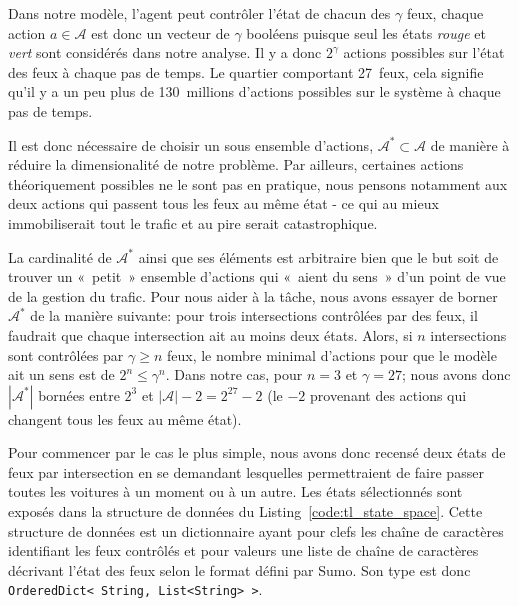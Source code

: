 \documentclass[11pt]{article}
\begin{document}
Dans notre modèle, l'agent peut contrôler l'état de chacun des \(\gamma\) feux, chaque action \(a \in \mathcal{A}\) est donc un vecteur de \(\gamma\) booléens puisque seul les états \emph{rouge} et \emph{vert} sont considérés dans notre analyse.  Il y a donc \(2^\gamma\) actions possibles sur l'état des feux à chaque pas de temps. Le quartier comportant 27 feux, cela signifie qu'il y a un peu plus de 130 millions d'actions possibles sur le système à chaque pas de temps.

Il est donc nécessaire de choisir un sous ensemble d'actions, \(\mathcal{A}^* \subset \mathcal{A}\) de manière à réduire la dimensionalité de notre problème. Par ailleurs, certaines actions théoriquement possibles ne le sont pas en pratique, nous pensons notamment aux deux actions qui passent tous les feux au même état - ce qui au mieux immobiliserait tout le trafic et au pire serait catastrophique.

La cardinalité de \(\mathcal{A}^*\) ainsi que ses éléments est arbitraire bien que le but soit de trouver un « petit » ensemble d'actions qui « aient du sens » d'un point de vue de la gestion du trafic. Pour nous aider à la tâche, nous avons essayer de borner \(\mathcal{A^*}\) de la manière suivante: pour trois intersections contrôlées par des feux, il faudrait que chaque intersection ait au moins deux états. Alors, si \(n\) intersections sont contrôlées par \(\gamma \geq n\) feux, le nombre minimal d'actions pour que le modèle ait un sens est de \(2^n \leq \gamma^n\). Dans notre cas, pour \(n = 3\) et \(\gamma = 27\); nous avons donc \(|\mathcal{A}^*|\) bornées entre \(2^3\) et \(|\mathcal{A}| - 2 = 2^{27} - 2\) (le \(-2\) provenant des actions qui changent tous les feux au même état).

Pour commencer par le cas le plus simple, nous avons donc recensé deux états de feux par intersection en se demandant lesquelles permettraient de faire passer toutes les voitures à un moment ou à un autre. Les états sélectionnés sont exposés dans la structure de données du Listing \ref{code:tl_state_space}. Cette structure de données est un dictionnaire ayant pour clefs les chaîne de caractères identifiant les feux contrôlés et pour valeurs une liste de chaîne de caractères décrivant l'état des feux selon le format défini par Sumo. Son type est donc \texttt{OrderedDict< String, List<String> >}.
\end{document}
